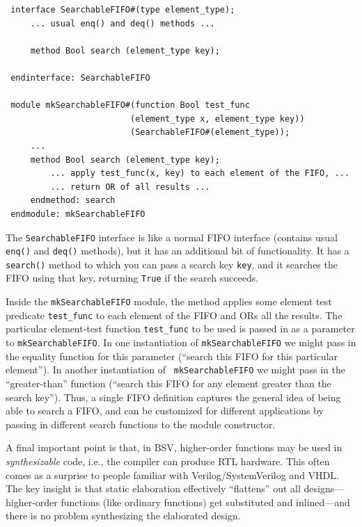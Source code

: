 \documentclass[twoside,letterpaper]{article}
\newcommand{\BSV}{BSV}
\begin{document}
\begin{verbatim}
 interface SearchableFIFO#(type element_type);
     ... usual enq() and deq() methods ...

     method Bool search (element_type key);

 endinterface: SearchableFIFO

 module mkSearchableFIFO#(function Bool test_func
                         (element_type x, element_type key))
                         (SearchableFIFO#(element_type));
     ...
     method Bool search (element_type key);
         ... apply test_func(x, key) to each element of the FIFO, ...
         ... return OR of all results ...
     endmethod: search
 endmodule: mkSearchableFIFO
\end{verbatim}

The \texttt{SearchableFIFO} interface is like a normal FIFO interface
(contains usual \texttt{enq()} and \texttt{deq()} methods), but it has an
additional bit of functionality.  It has a \texttt{search()} method to
which you can pass a search key \texttt{key}, and it searches the FIFO
using that key, returning \texttt{True} if the search succeeds.

Inside the \texttt{mkSearchableFIFO} module, the method applies some
element test predicate \texttt{test\_func} to each element of the FIFO
and ORs all the results.  The particular element-test function
\texttt{test\_func} 
to be used is passed in as a parameter to \texttt{mkSearchableFIFO}.  In
one instantiation of \texttt{mkSearchableFIFO} we might pass in the
equality function for this parameter (``search this FIFO for this
particular element'').  In another instantiation of {\tt
mkSearchableFIFO} we might pass in the ``greater-than'' function
(``search this FIFO for any element greater than the search key'').
Thus, a single FIFO definition captures the general idea of being able
to search a FIFO, and can be customized for different applications by
passing in different search functions to the module constructor.

A final important point is that, in {\BSV}, higher-order functions may
be used in \emph{synthesizable} code, i.e., the compiler can produce
RTL hardware.  This often comes as a surprise to people familiar with
Verilog/SystemVerilog and VHDL.  The key insight is that static
elaboration effectively ``flattens'' out all designs---higher-order
functions (like ordinary functions) get substituted and inlined---and
there is no problem synthesizing the elaborated design.

\end{document}
